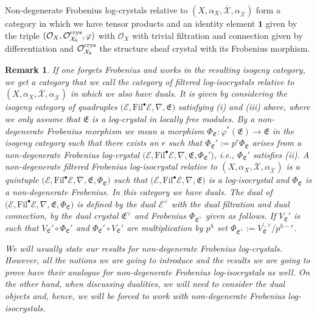 \documentclass[asterisque,english]{smfart}
\newtheorem{remark}[theo]{Remark}
\begin{document}
Non-degenerate Frobenius log-crystals relative to $(X,\alpha_X,\overline{\mathcal{X}},\alpha_{\overline{\mathcal{X}}})$ form a category in which we have tensor products and an identity element $\mathbf{1}$  given by the triple $ (\mathcal{O}_X, \mathcal{O}_{\mathcal{X}_k}^{\rm crys}, \varphi )$ with $\mathcal{O}_X$ with trivial filtration and connection given by differentiation and $\mathcal{O}_{\mathcal{X}_k}^{\rm crys}$ the structure sheaf crystal with its Frobenius morphism.



\begin{remark}\label{rmk:dualisocrystal} If one forgets Frobenius and works in the resulting isogeny category, we get a category that we call the category of filtered log-isocrystals relative to $(X,\alpha_X,\overline{\mathcal{X}},\alpha_{\overline{\mathcal{X}}})$ in which we also have duals. It is given by considering the isogeny category of  quadruples $ \bigl(\mathcal{E},\mathrm{Fil}^\bullet \mathcal{E}, \nabla,\mathfrak{E}\bigr)$ satisfying (i) and (iii) above, where we only assume that $\mathfrak{E}$ is a log-crystal in locally free modules. By a non-degenerate Frobenius morphism we mean a morphism  $\Phi_{\mathfrak{E}}\colon \varphi^\ast(\mathfrak{E}) \to \mathfrak{E}$ in the isogeny category such that there exists an $r$ such that $\Phi_{\mathfrak{E}}':=p^r \Phi_{\mathfrak{E}}$ arises from a non-degenerate Frobenius log-crystal $ \bigl(\mathcal{E},\mathrm{Fil}^\bullet \mathcal{E}, \nabla,\mathfrak{E}, \Phi_{\mathfrak{E}}'\bigr)$, i.e., $\Phi_{\mathfrak{E}}'$ satisfies (ii). A non-degenerate filtered  Frobenius log-isocrystal relative to $(X,\alpha_X,\overline{\mathcal{X}},\alpha_{\overline{\mathcal{X}}})$ is a quintuple $ \bigl(\mathcal{E},\mathrm{Fil}^\bullet \mathcal{E}, \nabla,\mathfrak{E},\Phi_{\mathfrak{E}}\bigr)$ such that $ \bigl(\mathcal{E},\mathrm{Fil}^\bullet \mathcal{E}, \nabla,\mathfrak{E}\bigr)$ is a log-isocrystal and $\Phi_{\mathfrak{E}}$ is a non-degenerate Frobenius. In this category we have duals. The dual of $ \bigl(\mathcal{E},\mathrm{Fil}^\bullet \mathcal{E}, \nabla,\mathfrak{E},\Phi_{\mathfrak{E}}\bigr)$ is defined by the dual $\mathcal{E}^\vee$ with the dual filtration  and dual connection, by  the dual crystal $\mathfrak{E}^\vee$ and Frobenius $\Phi_{\mathfrak{E}^\vee}$ given as follows. If $V_{\mathfrak{E}}'$ is such that  $V_{\mathfrak{E}}' \circ \Phi_{\mathfrak{E}}'$ and $\Phi_{\mathfrak{E}}'\circ V_{\mathfrak{E}}' $ are multiplication by $p^h$ set $\Phi_{\mathfrak{E}^\vee}:=V_{\mathfrak{E}}^{',\vee}/p^{h-r}$.

We will usually state our results for non-degenerate Frobenius log-crystals. However, all the notions we are going to introduce and the results we are going to prove have their analogue for non-degenerate Frobenius log-isocrystals as well. On the other hand, when discussing dualities, we will need to consider the dual objects and, hence, we will be forced to work with non-degenerate Frobenius log-isocrystals.
\end{remark}
\end{document}
